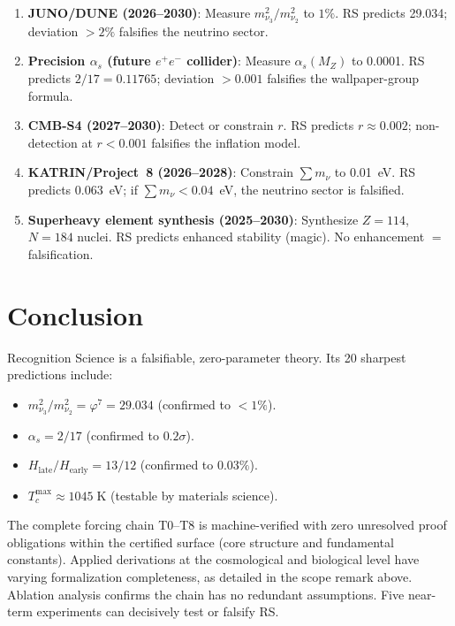 \documentclass[12pt,a4paper]{article}
\theoremstyle{definition}
\theoremstyle{remark}
\begin{document}
\begin{enumerate}
  \item \textbf{JUNO/DUNE (2026--2030)}: Measure
  $m_{\nu_3}^2/m_{\nu_2}^2$ to $1\%$.  RS predicts 29.034; deviation
  $> 2\%$ falsifies the neutrino sector.

  \item \textbf{Precision $\alpha_s$ (future $e^+e^-$ collider)}:
  Measure $\alpha_s(M_Z)$ to 0.0001.  RS predicts $2/17 = 0.11765$;
  deviation $> 0.001$ falsifies the wallpaper-group formula.

  \item \textbf{CMB-S4 (2027--2030)}: Detect or constrain $r$.  RS
  predicts $r \approx 0.002$; non-detection at $r < 0.001$ falsifies
  the inflation model.

  \item \textbf{KATRIN/Project~8 (2026--2028)}: Constrain $\sum m_\nu$
  to 0.01~eV.  RS predicts 0.063~eV; if $\sum m_\nu < 0.04$~eV, the
  neutrino sector is falsified.

  \item \textbf{Superheavy element synthesis (2025--2030)}: Synthesize
  $Z = 114$, $N = 184$ nuclei.  RS predicts enhanced stability (magic).
  No enhancement $=$ falsification.
\end{enumerate}

\section{Conclusion}
\label{sec:conclusion}

Recognition Science is a falsifiable, zero-parameter theory.  Its 20
sharpest predictions include:
\begin{itemize}
  \item $m_{\nu_3}^2/m_{\nu_2}^2 = \varphi^7 = 29.034$ (confirmed to
  $< 1\%$).
  \item $\alpha_s = 2/17$ (confirmed to $0.2\sigma$).
  \item $H_{\mathrm{late}}/H_{\mathrm{early}} = 13/12$ (confirmed to
  $0.03\%$).
  \item $T_c^{\max} \approx 1045\;\mathrm{K}$ (testable by materials
  science).
\end{itemize}

The complete forcing chain T0--T8 is machine-verified with zero
unresolved proof obligations within the certified surface (core
structure and fundamental constants).  Applied derivations at the
cosmological and biological level have varying formalization
completeness, as detailed in the scope remark above.  Ablation
analysis confirms the chain has no redundant assumptions.  Five
near-term experiments can decisively test or falsify RS.
\end{document}
